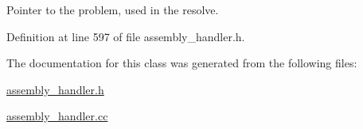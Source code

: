 Pointer to the problem, used in the resolve. 



Definition at line 597 of file assembly\+\_\+handler.\+h.



The documentation for this class was generated from the following files\+:\begin{DoxyCompactItemize}
\item 
\hyperlink{assembly__handler_8h}{assembly\+\_\+handler.\+h}\item 
\hyperlink{assembly__handler_8cc}{assembly\+\_\+handler.\+cc}\end{DoxyCompactItemize}
